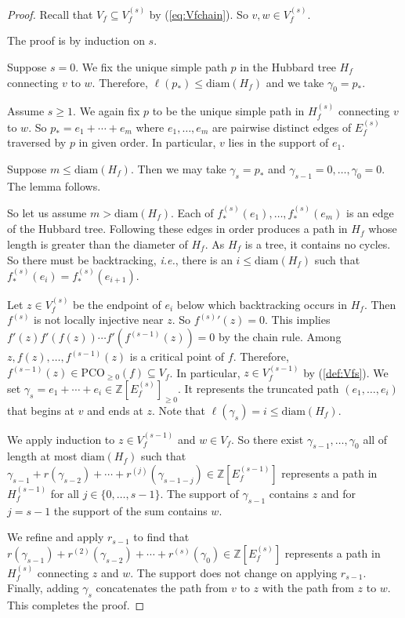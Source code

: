 \documentclass[12pt,oneside,a4]{amsart}
\newcommand{\IZ}{\mathbb{Z}}
\numberwithin{maincounter}{section}
\numberwithin{equation}{section}
\renewcommand{\subset}{\subseteq}
\newcommand{\pco}{\mathrm{PCO}}
\begin{document}
\begin{proof}
  Recall that $V_f \subset
  V_f^{(s)}$ by (\ref{eq:Vfchain}). So $v,w\in V_f^{(s)}$.

  The proof is by induction on $s$.
  
  Suppose $s=0$. We fix the unique
  simple path $p$ in the Hubbard tree $H_f$  connecting $v$ to
  $w$. Therefore, 
  $\ell(p_*)  \le \mathrm{diam}(H_f)$ and we take $\gamma_0=p_*$.

  Assume $s\ge 1$. We again fix $p$ to be the unique simple path in
  $H_f^{(s)}$ connecting $v$ to $w$. So $p_* = e_1+\cdots + e_m$ where
  $e_1,\ldots,e_m$ are pairwise distinct
  edges of $E_f^{(s)}$ traversed by $p$ in given
  order. In particular, $v$ lies in the support of $e_1$. 
  
  Suppose $m\le \mathrm{diam}(H_f)$. Then we may take $\gamma_s = p_*$ and
  $\gamma_{s-1}=0, \ldots,\gamma_0=0$. The lemma follows.
  
  So let us assume
  $m>\mathrm{diam}(H_f)$. Each of $f_*^{(s)}(e_1), \ldots,
  f_*^{(s)}(e_m)$ is an edge of the Hubbard tree. Following these
  edges
  in order
  produces a path in $H_f$ whose length is greater than the
  diameter of $H_f$. As $H_f$ is a tree, it contains no cycles.  So
  there must be backtracking, \textit{i.e.}, there is an $i\le \mathrm{diam}(H_f)$
  such that $f_*^{(s)}(e_i)=f_*^{(s)}(e_{i+1})$.

  Let  $z\in V_f^{(s)}$
  be the endpoint of $e_i$
  below which backtracking occurs in $H_f$. Then $f^{(s)}$ is not
  locally injective near $z$. So ${f^{(s)}}'(z)=0$. This implies
  $f'(z)f'(f(z))\cdots f'(f^{(s-1)}(z))=0$ by the chain rule.
  Among $z,f(z),\ldots,f^{(s-1)}(z)$ is a critical point of $f$.
  Therefore, $f^{(s-1)}(z) \in \pco_{\ge 0}(f) \subset V_f$. In particular,
  $z\in V_f^{(s-1)}$ by (\ref{def:Vfs}).  
  We set $\gamma_s=e_1+\cdots +e_i \in\IZ[E_f^{(s)}]_{\ge 0}$. 
  It represents
  the truncated path $(e_1,\ldots,e_i)$ that begins at $v$ and ends at
  $z$.
  Note that $\ell(\gamma_s) = i \le \mathrm{diam}(H_f)$.
  
  We apply induction to $z\in V_f^{(s-1)}$ and $w\in V_f$. So there  exist
  $\gamma_{s-1},\ldots,\gamma_0$ all of length at most 
  $\mathrm{diam}(H_f)$ such that 
  $\gamma_{s-1}+r(\gamma_{s-2}) + \cdots
  +r^{(j)}(\gamma_{s-1-j})\in\IZ[E_f^{(s-1)}]$
  represents a path in $H_f^{(s-1)}$ for all $j\in \{0,\ldots,s-1\}$.
  The support of $\gamma_{s-1}$ contains $z$ and for $j=s-1$ the
  support of the sum contains $w$. 

  We refine and apply $r_{s-1}$ to find that
  $r(\gamma_{s-1})+r^{(2)}(\gamma_{s-2}) + \cdots
  +r^{(s)}(\gamma_0)\in\IZ[E_f^{(s)}]$ represents a path in
  $H_f^{(s)}$ connecting $z$ and $w$. The support does not change on
  applying $r_{s-1}$. 
  Finally, adding  $\gamma_s$ concatenates the path from $v$ to $z$
  with the path from $z$ to $w$. This completes the proof.
\end{proof}
\end{document}
